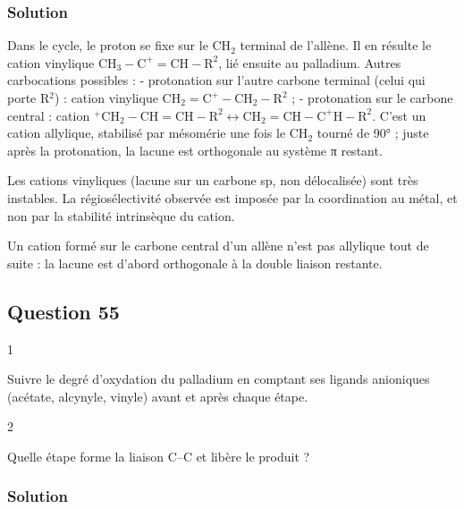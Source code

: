\documentclass[11pt,a4paper]{article}
\begin{document}
\hypertarget{solution-53}{%
\subsubsection{Solution}\label{solution-53}}

Dans le cycle, le proton se fixe sur le CH\(_2\) terminal de l'allène. Il en résulte le cation vinylique \(\mathrm{CH_3{-}C^+{=}CH{-}R^2}\), lié ensuite au palladium. Autres carbocations possibles :
- protonation sur l'autre carbone terminal (celui qui porte R\(^2\)) : cation vinylique \(\mathrm{CH_2{=}C^+{-}CH_2{-}R^2}\) ;
- protonation sur le carbone central : cation \(\mathrm{^+CH_2{-}CH{=}CH{-}R^2}\leftrightarrow\mathrm{CH_2{=}CH{-}C^+H{-}R^2}\). C'est un cation allylique, stabilisé par mésomérie une fois le CH\(_2\) tourné de 90° ; juste après la protonation, la lacune est orthogonale au système π restant.

Les cations vinyliques (lacune sur un carbone sp, non délocalisée) sont très instables. La régiosélectivité observée est imposée par la coordination au métal, et non par la stabilité intrinsèque du cation.

\begin{piege}

Un cation formé sur le carbone central d'un allène n'est pas allylique tout de suite : la lacune est d'abord orthogonale à la double liaison restante.

\end{piege}

\hypertarget{question-55}{%
\subsection{Question 55}\label{question-55}}

\begin{indication}{1}

Suivre le degré d'oxydation du palladium en comptant ses ligands anioniques (acétate, alcynyle, vinyle) avant et après chaque étape.

\end{indication}

\begin{indication}{2}

Quelle étape forme la liaison C--C et libère le produit ?

\end{indication}

\hypertarget{solution-54}{%
\subsubsection{Solution}\label{solution-54}}
\end{document}

